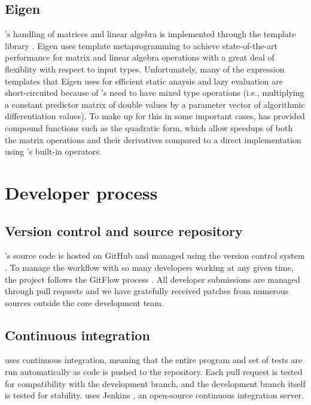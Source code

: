 \documentclass[article]{jss}
\begin{document}
\subsection{Eigen}

's handling of matrices and linear algebra is
implemented through the   template library
\citep{Eigen:2012}.  Eigen uses template metaprogramming to achieve
state-of-the-art performance for matrix and linear algebra operations
with a great deal of flexiblity with respect to input types.
Unfortunately, many of the expression templates that Eigen uses for
efficient static anaysis and lazy evaluation are short-circuited
because of 's need to have mixed type operations (i.e.,
multiplying a constant predictor matrix of double values by a
parameter vector of algorithmic differentiation values).  To make up for
this in some important cases,  has provided compound
functions such as the quadratic form, which allow speedups of both the
matrix operations and their derivatives compared to a direct
implementation using 's built-in operators.


\section{Developer process}

\subsection{Version control and source repository}

's source code is hosted on GitHub and managed using
the  version control system \citep{Chacon:2009}.  To manage
the workflow with so many developers working at any given time, the
project follows the GitFlow process \citep{Driessen:2010}.  All
developer submissions are managed through pull requests and we have
gratefully received patches from numerous sources outside the core
development team.


\subsection{Continuous integration}

 uses continuous integration, meaning that the entire
program and set of tests are run automatically as code is pushed to
the  repository.  Each pull request is tested for
compatibility with the development branch, and the development branch
itself is tested for stability.   uses Jenkins
\citep{Smart:2011}, an open-source continuous integration server.
\end{document}
